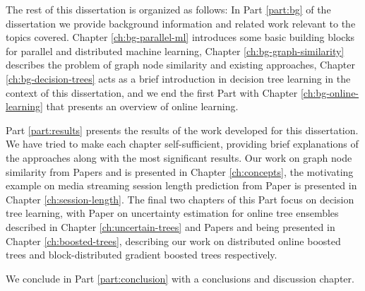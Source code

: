 The rest of this dissertation is organized as follows:
In Part \ref{part:bg} of the dissertation we provide background information and
related work relevant to the topics covered. Chapter
\ref{ch:bg-parallel-ml} introduces some basic building blocks
for parallel and distributed machine learning, Chapter \ref{ch:bg-graph-similarity} describes the problem
of graph node similarity and existing approaches, Chapter \ref{ch:bg-decision-trees} acts as a brief introduction
in decision tree learning in the context of this dissertation, and we end the first Part with Chapter \ref{ch:bg-online-learning} that presents an overview of online learning.

Part \ref{part:results} presents the results of the work developed for this
dissertation. We have tried to make each chapter self-sufficient, providing
brief explanations of the approaches along with the most significant results.
Our work on graph node similarity from Papers \conceptsicdmNum and \conceptskaisNum
is presented in Chapter \ref{ch:concepts},
the motivating example on media streaming session length prediction from Paper \sessionlengthNum is presented in Chapter \ref{ch:session-length}. The final
two chapters of this Part focus on decision tree learning, with Paper \uncertaintreesNum
on uncertainty estimation for online tree ensembles described in Chapter \ref{ch:uncertain-trees} and Papers \boostvhtNum and \blockgbtNum
being presented in Chapter \ref{ch:boosted-trees}, describing our work on distributed online boosted trees
and block-distributed gradient boosted trees respectively.

We conclude in Part \ref{part:conclusion} with a conclusions and discussion
chapter.
